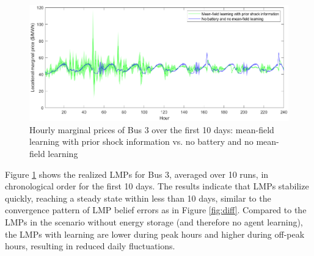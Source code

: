 \documentclass{article}
\theoremstyle{definition}
\theoremstyle{plain}
\begin{document}
\begin{figure}[!h]
   \centering
    \includegraphics[width=\textwidth]{meanfieldcomparefirst10.eps}
   \caption{Hourly marginal prices of Bus 3 over the first 10 days: mean-field learning with prior shock information vs. no battery and no mean-field learning}
    \label{fig:f10days}
    {}
\end{figure}
Figure \ref{fig:f10days} shows the realized LMPs for Bus 3, averaged over 10 runs, in chronological order for the first 10 days. The results indicate that LMPs stabilize quickly, reaching a steady state within less than 10 days, similar to the convergence pattern of LMP belief errors as in Figure \ref{fig:diff}. 
Compared to the LMPs in the scenario without energy storage (and therefore no agent learning), the LMPs with learning are lower during peak hours and higher during off-peak hours, resulting in reduced daily fluctuations.
\end{document}
